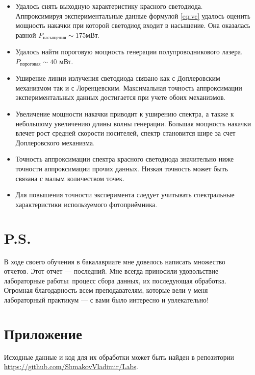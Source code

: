 \documentclass[a4paper, 12pt]{extarticle}
\begin{document}
\begin{itemize}
    \item Удалось снять выходную характеристику красного светодиода. Аппроксимируя экспериментальные данные формулой \ref{eq:vc} удалось оценить мощность накачки при которой светодиод входит в насыщение. Она оказалась равной $P_{\text{насыщения}} \sim 175$мВт.
    \item Удалось найти пороговую мощность генерации полупроводникового лазера. $P_{\text{пороговая}} \sim 40$ мВт.
    \item Уширение линии излучения светодиода связано как с Доплеровским механизмом так и с Лоренцевским. Максимальная точность аппроксимации экспериментальных данных достигается при учете обоих механизмов.
    \item Увеличение мощности накачки приводит к уширению спектра, а также к небольшому увеличению длины волны генерации. Большая мощность накачки влечет рост средней скорости носителей, спектр становится шире за счет Доплеровского механизма.
    \item Точность аппроксимации спектра красного светодиода значительно ниже точности аппроксимации прочих данных. Низкая точность может быть связана с малым количеством точек. 
    \item Для повышения точности эксперимента следует учитывать спектральные характеристики используемого фотоприёмника.
\end{itemize}



\section*{\textcolor{header}{P.S.}}
В ходе своего обучения в бакалавриате мне довелось написать множество отчетов. Этот отчет — последний. Мне всегда приносили удовольствие лабораторные работы: процесс сбора данных, их последующая обработка. Огромная благодарность всем преподавателям, которые вели у меня лабораторный практикум — с вами было интересно и увлекательно!




\section*{\textcolor{header}{Приложение}}

Исходные данные и код для их обработки может быть найден в репозитории \url{https://github.com/ShmakovVladimir/Labs}.
\end{document}
